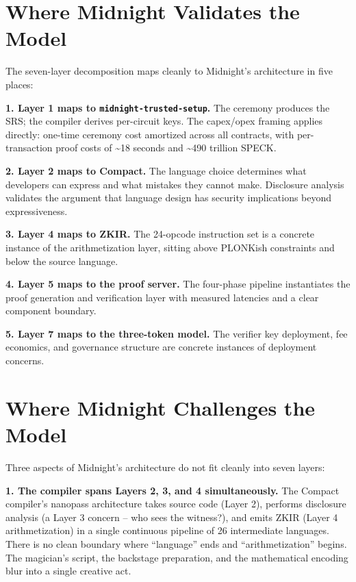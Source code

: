 \documentclass[
  11pt,
  openany]{report}
\renewcommand{\textbf}[1]{{\bfseries\color{MidnightBold}#1}}
\begin{document}
\section{Where Midnight Validates the
Model}\label{where-midnight-validates-the-model}

The seven-layer decomposition maps cleanly to Midnight's architecture in five
places:

\textbf{1. Layer 1 maps to \texttt{midnight-trusted-setup}.} The ceremony
produces the SRS; the compiler derives per-circuit keys. The capex/opex framing
applies directly: one-time ceremony cost amortized across all contracts, with
per-transaction proof costs of \textasciitilde18 seconds and \textasciitilde490
trillion SPECK.

\textbf{2. Layer 2 maps to Compact.} The language choice determines what
developers can express and what mistakes they cannot make. Disclosure analysis
validates the argument that language design has security implications beyond
expressiveness.

\textbf{3. Layer 4 maps to ZKIR.} The 24-opcode instruction set is a concrete
instance of the arithmetization layer, sitting above PLONKish constraints and
below the source language.

\textbf{4. Layer 5 maps to the proof server.} The four-phase pipeline
instantiates the proof generation and verification layer with measured latencies
and a clear component boundary.

\textbf{5. Layer 7 maps to the three-token model.} The verifier key deployment,
fee economics, and governance structure are concrete instances of deployment
concerns.

\section{Where Midnight Challenges the
Model}\label{where-midnight-challenges-the-model}

Three aspects of Midnight's architecture do not fit cleanly into seven layers:

\textbf{1. The compiler spans Layers 2, 3, and 4 simultaneously.} The Compact
compiler's nanopass architecture takes source code (Layer 2), performs
disclosure analysis (a Layer 3 concern -- who sees the witness?), and emits ZKIR
(Layer 4 arithmetization) in a single continuous pipeline of 26 intermediate
languages. There is no clean boundary where ``language'' ends and
``arithmetization'' begins. The magician's script, the backstage preparation,
and the mathematical encoding blur into a single creative act.
\end{document}

